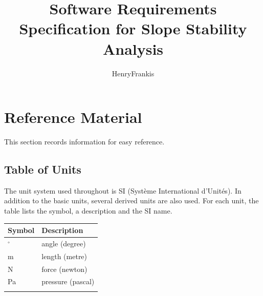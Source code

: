 \documentclass[12pt]{article}
\title{Software Requirements Specification for Slope Stability Analysis}
\author{HenryFrankis}
\begin{document}
\maketitle
\tableofcontents
\newpage
\section{Reference Material}
\label{Sec:RefMat}
This section records information for easy reference.
\subsection{Table of Units}
\label{Sec:ToU}
The unit system used throughout is SI (Système International d'Unités). In addition to the basic units, several derived units are also used. For each unit, the table lists the symbol, a description and the SI name.
\begin{longtable*}{l l}
\toprule
Symbol & Description
\\
\midrule
${}^{\circ}$ & angle (degree)
\\
m & length (metre)
\\
N & force (newton)
\\
Pa & pressure (pascal)
\\
\bottomrule
\label{Table:ToU}
\end{longtable*}
\end{document}
